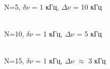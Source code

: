 \documentclass[a4paper,12pt]{article}
\begin{document}
\begin{enumerate}
\begin{figure}[h]
\begin{minipage}[h]{0.47\linewidth}
 \\ N=5, $\delta \nu$ = 1 кГц, $\Delta \nu$ = 10 кГц
\end{minipage}
\hfill
\begin{minipage}[h]{0.47\linewidth}
 \\ N=10, $\delta \nu$ = 1 кГц, $\Delta \nu$ = 5 кГц
\end{minipage}
\vfill
\begin{minipage}[h]{0.47\linewidth}
 \\ N=15, $\delta \nu$ = 1 кГц, $\Delta \nu$ $\approx$ 3 кГц

\end{minipage}
\end{figure}
\end{enumerate}
\end{document}
